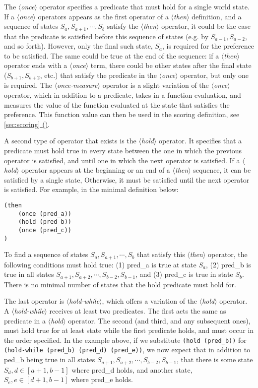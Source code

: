 \documentclass{article}
\newcommand{\dsl}[1]{{\it $\langle$#1$\rangle$}}
\newcommand*{\fullref}[1]{\hyperref[{#1}]{\autoref*{#1} (\nameref*{#1})}} %
\begin{document}
The \dsl{once} operator specifies a predicate that must hold for a single world state.
If a \dsl{once} operators appears as the first operator of a \dsl{then} definition, and a sequence of states $S_a, S_{a+1}, \cdots, S_b$ satisfy the \dsl{then} operator, it could be the case that the predicate is satisfied before this sequence of states (e.g. by $S_{a-1}, S_{a-2}$, and so forth).
However, only the final such state, $S_a$, is required for the preference to be satisfied.
The same could be true at the end of the sequence: if a \dsl{then} operator ends with a \dsl{once} term, there could be other states after the final state ($S_{b+1}, S_{b+2}$, etc.) that satisfy the predicate in the \dsl{once} operator, but only one is required.
The \dsl{once-measure} operator is a slight variation of the \dsl{once} operator, which in addition to a predicate, takes in a function evaluation, and measures the value of the function evaluated at the state that satisfies the preference.
This function value can then be used in the scoring definition, see \fullref{sec:scoring}.

A second type of operator that exists is the \dsl{hold} operator.
It specifies that a predicate must hold true in every state between the one in which the previous operator is satisfied, and until one in which the next operator is satisfied.
If a \dsl{hold} operator appears at the beginning or an end of a \dsl{then} sequence, it can be satisfied by a single state,
Otherwise, it must be satisfied until the next operator is satisfied.
For example, in the minimal definition below:
\begin{lstlisting}
(then
    (once (pred_a))
    (hold (pred_b))
    (once (pred_c))
)
\end{lstlisting}
To find a sequence of states $S_a, S_{a+1}, \cdots, S_b$ that satisfy this \dsl{then} operator, the following conditions must hold true: (1) pred_a is true at state $S_a$, (2) pred_b is true in all states $S_{a+1}, S_{a+2}, \cdots, S_{b-2}, S_{b-1}$, and (3) pred_c is true in state $S_b$.
There is no minimal number of states that the hold predicate must hold for.

The last operator is \dsl{hold-while}, which offers a variation of the \dsl{hold} operator.
A \dsl{hold-while} receives at least two predicates.
The first acts the same as predicate in a \dsl{hold} operator.
The second (and third, and any subsequent ones), must hold true for at least state while the first predicate holds, and must occur in the order specified.
In the example above, if we substitute \lstinline{(hold (pred_b))} for \lstinline{(hold-while (pred_b) (pred_d) (pred_e))}, we now expect that in addition to ped_b being true in all states $S_{a+1}, S_{a+2}, \cdots, S_{b-2}, S_{b-1}$, that there is some state $S_d, d \in [a+1, b-1]$ where pred_d holds, and another state, $S_e, e \in [d+1, b-1]$ where pred_e holds.
\end{document}
